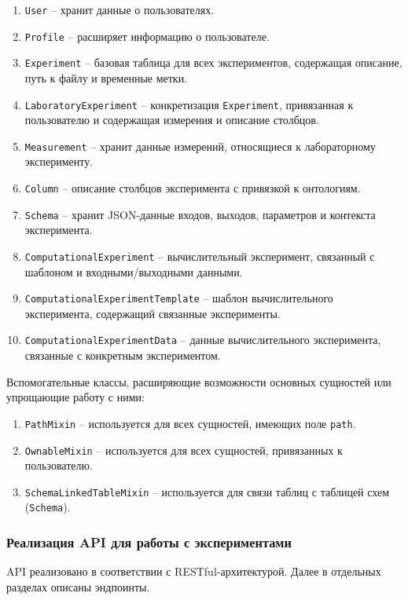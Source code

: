 \begin{enumerate}
\item \texttt{User} -- хранит данные о пользователях.
\item \texttt{Profile} -- расширяет информацию о пользователе.
\item \texttt{Experiment} -- базовая таблица для всех экспериментов, содержащая описание, путь к файлу и временные метки.
\item \texttt{LaboratoryExperiment} -- конкретизация \texttt{Experiment}, привязанная к пользователю и содержащая измерения и описание столбцов.
\item \texttt{Measurement} -- хранит данные измерений, относящиеся к лабораторному эксперименту.
\item \texttt{Column} -- описание столбцов эксперимента с привязкой к онтологиям.
\item \texttt{Schema} -- хранит JSON-данные входов, выходов, параметров и контекста эксперимента.
\item \texttt{ComputationalExperiment} -- вычислительный эксперимент, связанный с шаблоном и входными/выходными данными.
\item \texttt{ComputationalExperimentTemplate} -- шаблон вычислительного эксперимента, содержащий связанные эксперименты.
\item \texttt{ComputationalExperimentData} -- данные вычислительного эксперимента, связанные с конкретным экспериментом.
\end{enumerate}

Вспомогательные классы, расширяющие возможности основных сущностей или упрощающие работу с ними:

\begin{enumerate}
\item \texttt{PathMixin} -- используется для всех сущностей, имеющих поле \texttt{path}.
\item \texttt{OwnableMixin} -- используется для всех сущностей, привязанных к пользователю.
\item \texttt{SchemaLinkedTableMixin} -- используется для связи таблиц с таблицей схем (\texttt{Schema}).
\end{enumerate}

\subsubsection{Реализация API для работы с экспериментами}

API реализовано в соответствии с RESTful-архитектурой.
Далее в отдельных разделах описаны эндпоинты.

